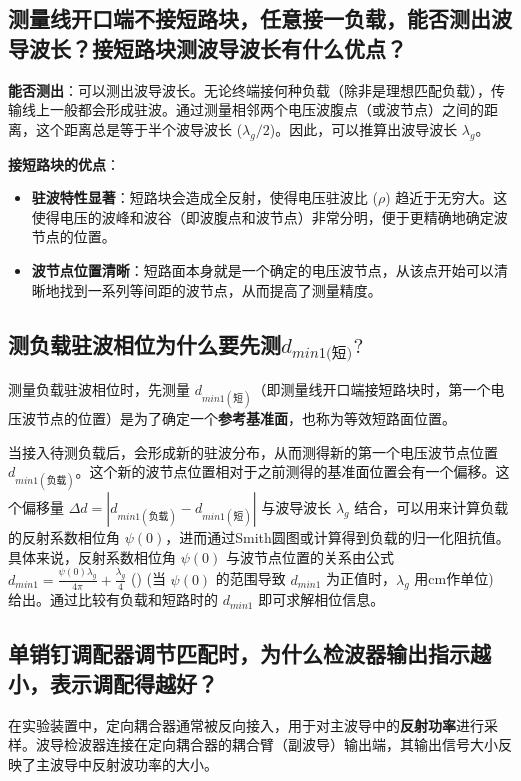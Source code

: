 \documentclass[12pt,a4paper,UTF8]{article}
\begin{document}
\subsection{测量线开口端不接短路块，任意接一负载，能否测出波导波长？接短路块测波导波长有什么优点？}
\textbf{能否测出}：可以测出波导波长。无论终端接何种负载（除非是理想匹配负载），传输线上一般都会形成驻波。通过测量相邻两个电压波腹点（或波节点）之间的距离，这个距离总是等于半个波导波长 ($\lambda_g/2$)。因此，可以推算出波导波长 $\lambda_g$。

\textbf{接短路块的优点}：
\begin{itemize}
    \item \textbf{驻波特性显著}：短路块会造成全反射，使得电压驻波比 ($\rho$) 趋近于无穷大。这使得电压的波峰和波谷（即波腹点和波节点）非常分明，便于更精确地确定波节点的位置。
    \item \textbf{波节点位置清晰}：短路面本身就是一个确定的电压波节点，从该点开始可以清晰地找到一系列等间距的波节点，从而提高了测量精度。
\end{itemize}

\subsection{测负载驻波相位为什么要先测$d_{min1\text{(短)}}?$}
测量负载驻波相位时，先测量 $d_{min1(\text{短})}$（即测量线开口端接短路块时，第一个电压波节点的位置）是为了确定一个\textbf{参考基准面}，也称为等效短路面位置。

当接入待测负载后，会形成新的驻波分布，从而测得新的第一个电压波节点位置 $d_{min1(\text{负载})}$。这个新的波节点位置相对于之前测得的基准面位置会有一个偏移。这个偏移量 $\Delta d = |d_{min1(\text{负载})} - d_{min1(\text{短})}|$ 与波导波长 $\lambda_g$ 结合，可以用来计算负载的反射系数相位角 $\psi(0)$，进而通过Smith圆图或计算得到负载的归一化阻抗值。具体来说，反射系数相位角 $\psi(0)$ 与波节点位置的关系由公式 $d_{min1} = \frac{\psi(0)\lambda_g}{4\pi} + \frac{\lambda_g}{4}$ () (当 $\psi(0)$ 的范围导致 $d_{min1}$ 为正值时，$\lambda_g$ 用cm作单位) 给出。通过比较有负载和短路时的 $d_{min1}$ 即可求解相位信息。

\subsection{单销钉调配器调节匹配时，为什么检波器输出指示越小，表示调配得越好？}
在实验装置中，定向耦合器通常被反向接入，用于对主波导中的\textbf{反射功率}进行采样。波导检波器连接在定向耦合器的耦合臂（副波导）输出端，其输出信号大小反映了主波导中反射波功率的大小。
\end{document}
